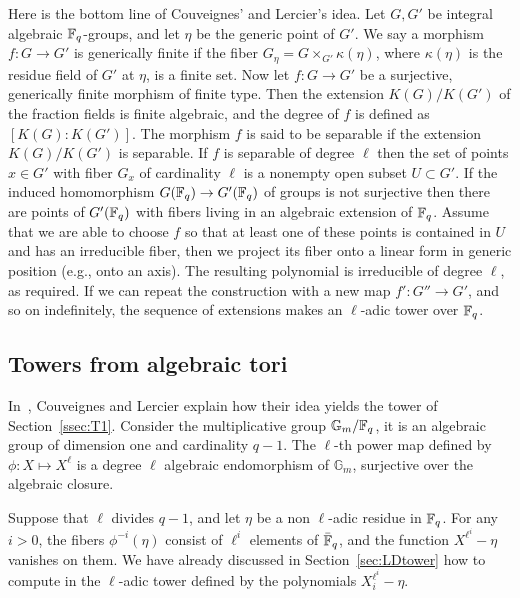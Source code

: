 \documentclass{sig-alternate}
\begin{document}
Here is the bottom line of Couveignes' and Lercier's idea. Let $G, G'$ be integral algebraic 
$\mathbb{F}_q$-groups, and let $\eta$ be the generic point of $G'$. We say a morphism $f: G \rightarrow 
G'$ is generically finite if the fiber $G_\eta = G \times_{G'} \kappa(\eta)$, where $\kappa(\eta)$ 
is the residue field of $G'$ at $\eta$, is a finite set. Now let $f: G \rightarrow G'$ be a 
surjective, generically finite morphism of finite type. Then the extension $K(G)/K(G')$ of the 
fraction fields is finite algebraic, and the degree of $f$ is defined as $[K(G): K(G')]$. The 
morphism $f$ is said to be separable if the extension $K(G)/K(G')$ is separable. If $f$ is 
separable of degree $\ell$ then the set of points $x \in G'$ with fiber $G_x$ of cardinality 
$\ell$ is a nonempty open subset $U \subset G'$. If the induced homomorphism $G(\mathbb{F}_q) \rightarrow 
G'(\mathbb{F}_q)$ of groups is not surjective then there are points of $G'(\mathbb{F}_q)$ with fibers living in an 
algebraic extension of $\mathbb{F}_q$. Assume that we are able to choose $f$ so that at least one of these 
points is contained in $U$ and has an irreducible fiber, then we project its fiber onto a linear 
form in generic position (e.g., onto an axis). The resulting polynomial is irreducible of degree 
$\ell$, as required. If we can repeat the construction with a new map $f':G''\to G'$, and so on 
indefinitely, the sequence of extensions makes an $\ell$-adic tower over $\mathbb{F}_q$.






\subsection{Towers from algebraic tori}

In~\cite{couveignes+lercier11}, Couveignes and Lercier explain how
their idea yields the tower of Section~\ref{ssec:T1}. Consider the
multiplicative group $\mathbb{G}_m/\mathbb{F}_q$, it is an algebraic group of
dimension one and cardinality $q-1$.  The $\ell$-th power map defined
by $\phi:X\mapsto X^\ell$ is a degree $\ell$ algebraic endomorphism of
$\mathbb{G}_m$, surjective over the algebraic closure.

Suppose that $\ell$ divides $q-1$, and let $\eta$ be a non $\ell$-adic
residue in $\mathbb{F}_q$. For any $i>0$, the fibers $\phi^{-i}(\eta)$ consist
of $\ell^i$ elements of $\bar{\mathbb{F}}_q$, and the function
$X^{\ell^i}-\eta$ vanishes on them. We have already discussed in
Section~\ref{sec:LDtower} how to compute in the $\ell$-adic tower
defined by the polynomials $X_i^{\ell^i}-\eta$.
\end{document}
